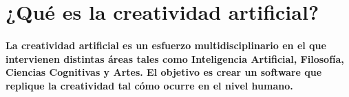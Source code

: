 \section{¿Qué es la creatividad artificial?}
\paragraph{La creatividad artificial es un esfuerzo multidisciplinario en el que intervienen distintas áreas tales como Inteligencia Artificial, Filosofía, Ciencias Cognitivas y Artes. El objetivo es crear un software que replique la creatividad tal cómo ocurre en el nivel humano.}


